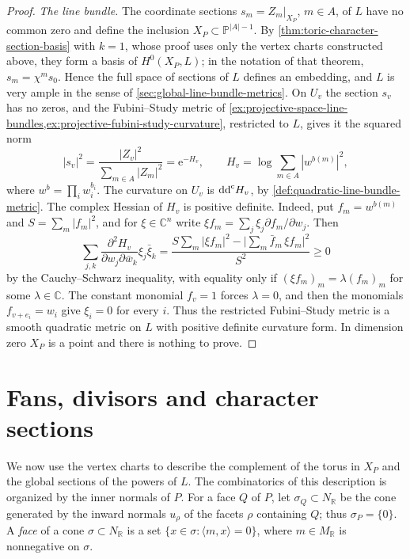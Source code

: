 \begin{proof}
\emph{The line bundle.} The coordinate sections $s_m=Z_m|_{X_P}$, $m\in A$, of $L$ have no common zero and define the inclusion $X_P\subset\mathbb P^{|A|-1}$. By \cref{thm:toric-character-section-basis} with $k=1$, whose proof uses only the vertex charts constructed above, they form a basis of $H^0(X_P,L)$; in the notation of that theorem, $s_m=\chi^ms_0$. Hence the full space of sections of $L$ defines an embedding, and $L$ is very ample in the sense of \cref{sec:global-line-bundle-metrics}. On $U_v$ the section $s_v$ has no zeros, and the Fubini--Study metric of \cref{ex:projective-space-line-bundles,ex:projective-fubini-study-curvature}, restricted to $L$, gives it the squared norm
\[
 |s_v|^2=\frac{|Z_v|^2}{\sum_{m\in A}|Z_m|^2}=\mathrm e^{-H_v},\qquad
 H_v=\log\sum_{m\in A}|w^{b(m)}|^2,
\]
where $w^b=\prod_iw_i^{b_i}$. The curvature on $U_v$ is $\mathrm{dd}^{\mathrm{c}} H_v$, by \cref{def:quadratic-line-bundle-metric}. The complex Hessian of $H_v$ is positive definite. Indeed, put $f_m=w^{b(m)}$ and $S=\sum_m|f_m|^2$, and for $\xi\in\mathbb C^n$ write $\xi f_m=\sum_j\xi_j\partial f_m/\partial w_j$. Then
\[
 \sum_{j,k}\frac{\partial^2H_v}{\partial w_j\partial\bar w_k}\xi_j\bar\xi_k
  =\frac{S\sum_m|\xi f_m|^2-\bigl|\sum_m\bar f_m\,\xi f_m\bigr|^2}{S^2}\geq0
\]
by the Cauchy--Schwarz inequality, with equality only if $(\xi f_m)_m=\lambda(f_m)_m$ for some $\lambda\in\mathbb C$. The constant monomial $f_v=1$ forces $\lambda=0$, and then the monomials $f_{v+e_i}=w_i$ give $\xi_i=0$ for every $i$. Thus the restricted Fubini--Study metric is a smooth quadratic metric on $L$ with positive definite curvature form. In dimension zero $X_P$ is a point and there is nothing to prove.
\end{proof}

\section{Fans, divisors and character sections}
\label{sec:toric-fans-and-character-sections}
We now use the vertex charts to describe the complement of the torus in $X_P$ and the global sections of the powers of $L$. The combinatorics of this description is organized by the inner normals of $P$. For a face $Q$ of $P$, let $\sigma_Q\subset N_{\mathbb R}$ be the cone generated by the inward normals $u_\rho$ of the facets $\rho$ containing $Q$; thus $\sigma_P=\{0\}$. A \emph{face} of a cone $\sigma\subset N_{\mathbb R}$ is a set $\{x\in\sigma:\langle m,x\rangle=0\}$, where $m\in M_{\mathbb R}$ is nonnegative on $\sigma$.

